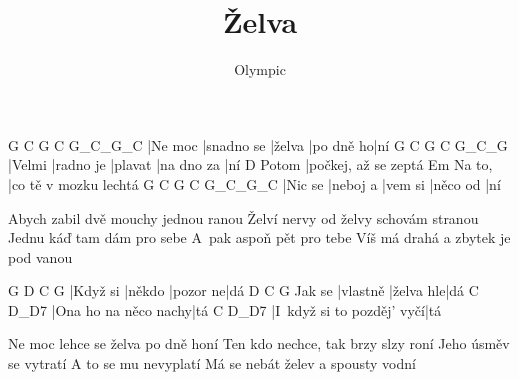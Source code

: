 \documentclass{song}
\title{Želva}
\author{Olympic}
\begin{document}
\strophe
G       C          G      C         G_C_G_C
|Ne moc |snadno se |želva |po dně ho|ní
G      C         G       C          G_C_G
|Velmi |radno je |plavat |na dno za |ní
      D
Potom |počkej, až se zeptá
       Em
Na to, |co tě v mozku lechtá
G       C        G       C        G_C_G_C
|Nic se |neboj a |vem si |něco od |ní
\endstrophe

\strophe*
Abych zabil dvě mouchy jednou ranou
Želví nervy od želvy schovám stranou
Jednu káď tam dám pro sebe
A~pak aspoň pět pro tebe
Víš má drahá a zbytek je pod vanou
\endstrophe

G        D      C        G
|Když si |někdo |pozor ne|dá
       D        C         G
Jak se |vlastně |želva hle|dá
C                    D_D7
|Ona ho na něco nachy|tá
C                         D_D7
|I~když si to pozděj' vyčí|tá
\endstrophe

\strophe*
Ne moc lehce se želva po dně honí
Ten kdo nechce, tak brzy slzy roní
Jeho úsměv se vytratí
A to se mu nevyplatí
Má se nebát želev a spousty vodní
\endstrophe
\end{document}
